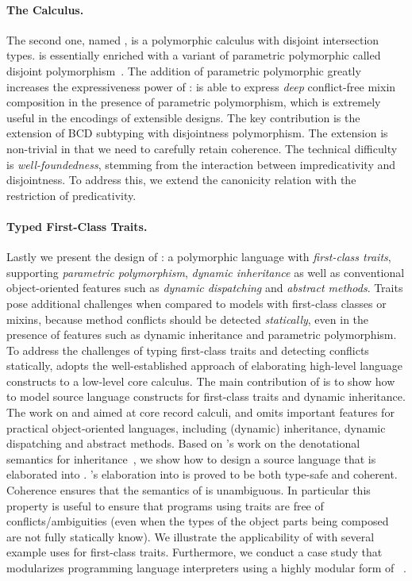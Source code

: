 \paragraph{The \fnamee Calculus.}

The second one, named \fnamee, is a polymorphic calculus with disjoint
intersection types. \fnamee is essentially \namee enriched with a variant of
parametric polymorphic called disjoint polymorphism~\citep{alpuimdisjoint}. The
addition of parametric polymorphic greatly increases the expressiveness power of
\namee: \fnamee is able to express \textit{deep} conflict-free mixin composition
in the presence of parametric polymorphism, which is extremely useful in the
encodings of extensible designs. The key contribution is the extension of BCD
subtyping with disjointness polymorphism. The extension is non-trivial in that
we need to carefully retain coherence. The technical difficulty is
\textit{well-foundedness}, stemming from the interaction between impredicativity
and disjointness. To address this, we extend the canonicity relation with the
restriction of predicativity.


\paragraph{Typed First-Class Traits.}

Lastly we present the design of \sedel: a polymorphic language with
\emph{first-class traits}, supporting \emph{parametric polymorphism}, \emph{dynamic inheritance} as well as
conventional object-oriented features such as \emph{dynamic dispatching} and \emph{abstract
  methods}. Traits pose additional challenges when compared to models with
first-class classes or mixins, because method conflicts should be detected
\emph{statically}, even in the presence of features such as dynamic inheritance and
parametric polymorphism. To address the challenges of
typing first-class traits and detecting conflicts statically, \sedel adopts the
well-established approach of elaborating high-level language constructs to a
low-level core calculus. The main contribution of \sedel is to show how to model
source language constructs for first-class traits and dynamic inheritance. The
work on \namee and \fnamee aimed at core record calculi, and omits important
features for practical object-oriented languages, including (dynamic) inheritance, dynamic
dispatching and abstract methods. Based on \citeauthor{cook1989denotational}'s
work on the denotational semantics for inheritance~\citep{cook1989denotational},
we show how to design a source language that is elaborated into \fnamee.
\sedel's elaboration into \fnamee is proved to be both type-safe and coherent.
Coherence ensures that the semantics of \sedel is unambiguous. In particular
this property is useful to ensure that programs using traits are free of
conflicts/ambiguities (even when the types of the object parts being composed
are not fully statically know). We illustrate the applicability of \sedel with
several example uses for first-class traits. Furthermore, we conduct a case study
that modularizes programming language interpreters using a highly modular form
of \visitor~\citep{oliveira09modular, togersen:2004}.

